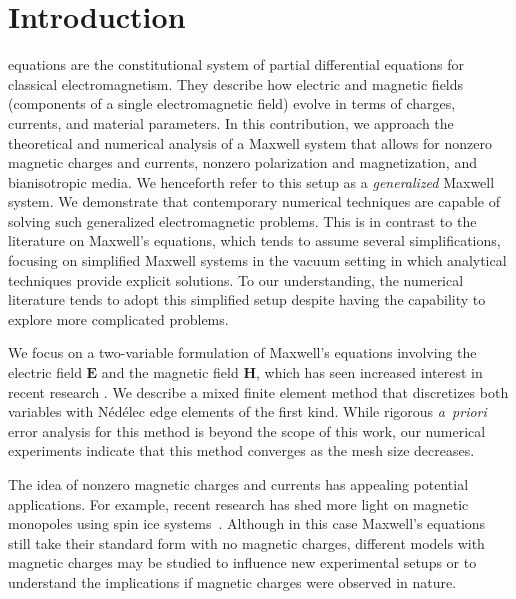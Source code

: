 \documentclass[journal,transmag]{IEEEtran}
\newcommand*\VF[1]{\mathbf{#1}}
\begin{document}
\section{\label{sec:intro} Introduction}
 equations are the constitutional system of partial differential equations for classical electromagnetism. They describe how electric and magnetic fields (components of a single electromagnetic field) evolve in terms of charges, currents, and material parameters. 
In this contribution, we approach the theoretical and numerical analysis of a Maxwell system that allows for nonzero magnetic charges and currents, nonzero polarization and magnetization, and bianisotropic media. We henceforth refer to this setup as a \emph{generalized} Maxwell system.
We demonstrate that contemporary numerical techniques are capable of solving such generalized electromagnetic problems.
This is in contrast to the literature on Maxwell's equations, which tends to assume several simplifications, focusing on simplified Maxwell systems in the vacuum setting in which analytical techniques provide explicit solutions. To our understanding, the numerical literature tends to adopt this simplified setup despite having the capability to explore more complicated problems.

We focus on a two-variable formulation of Maxwell's equations involving the electric field $\VF{E}$
and the magnetic field $\VF{H}$, which has seen increased interest in recent research
\cite{anees2018mixed,anees2018time,anees2019time,angermann2019semi,daveau1999new,mackie1993three,zyserman2000parallel}. 
We describe a mixed finite element method that discretizes both variables with N\'ed\'elec edge elements of the first kind. While rigorous \emph{a~priori} error analysis for this method is beyond the scope of this work, our numerical experiments indicate that this method converges as the mesh size decreases. 





The idea of nonzero magnetic charges and currents has appealing potential applications.
For example, recent research has shed more light on magnetic monopoles using spin ice systems~\cite{castelnovo2008magnetic,bramwell2009measurement,morris2009dirac}.
Although in this case Maxwell's equations still take their standard form with no magnetic charges, 
different models with magnetic charges may be studied to influence new experimental setups
or to understand the implications if magnetic charges were observed in nature. 
\end{document}
